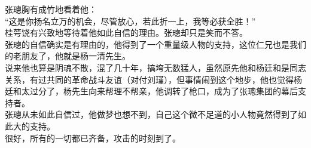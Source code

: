 \begin{multicols}{\theparacolNo}
张璁胸有成竹地看着他：\\

“这是你扬名立万的机会，尽管放心，若此折一上，我等必获全胜！”\\

桂萼饶有兴致地等待着他如此自信的理由。张璁却只是笑而不答。\\

张璁的自信确实是有理由的，他得到了一个重量级人物的支持，这位仁兄也是我们的老朋友了，他就是杨一清先生。\\

说来他也算是阴魂不散，混了几十年，搞垮无数猛人，虽然原先他和杨廷和是同志关系，有过共同的革命战斗友谊（对付刘瑾），但事情闹到这个地步，他也觉得杨廷和太过分了，杨先生向来帮理不帮亲，他调转了枪口，成为了张璁集团的幕后支持者。\\

张璁从未如此自信过，他做梦也想不到，自己这个微不足道的小人物竟然得到了如此大的支持。\\

很好，所有的一切都已齐备，攻击的时刻到了。\\
\ifnum{}
	\end{multicols}
\fi
\newpage
